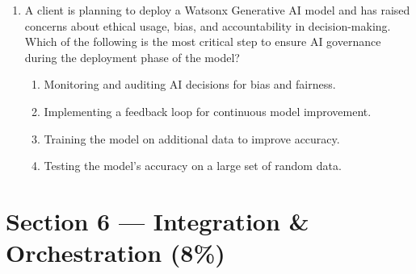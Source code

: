 \begin{enumerate}[resume,leftmargin=*]
\begin{enumerate}[label=\Alph*.]
  \item Use a fixed number of on-premise servers that can handle peak traffic, but run them at a lower capacity during low-demand periods.
  \item Deploy the model using a serverless architecture with auto-scaling to handle sudden spikes in traffic.
  \item Deploy a cloud-based instance with manual scaling to adjust resources when traffic spikes occur.
\end{enumerate}
\item A client is planning to deploy a Watsonx Generative AI model and has raised concerns about ethical usage, bias, and accountability in decision-making. Which of the following is the most critical step to ensure AI governance during the deployment phase of the model?
\begin{enumerate}[label=\Alph*.]
  \item Monitoring and auditing AI decisions for bias and fairness.
  \item Implementing a feedback loop for continuous model improvement.
  \item Training the model on additional data to improve accuracy.
  \item Testing the model's accuracy on a large set of random data.
\end{enumerate}
\end{enumerate}

\section*{Section 6 --- Integration \& Orchestration (8\%)}

